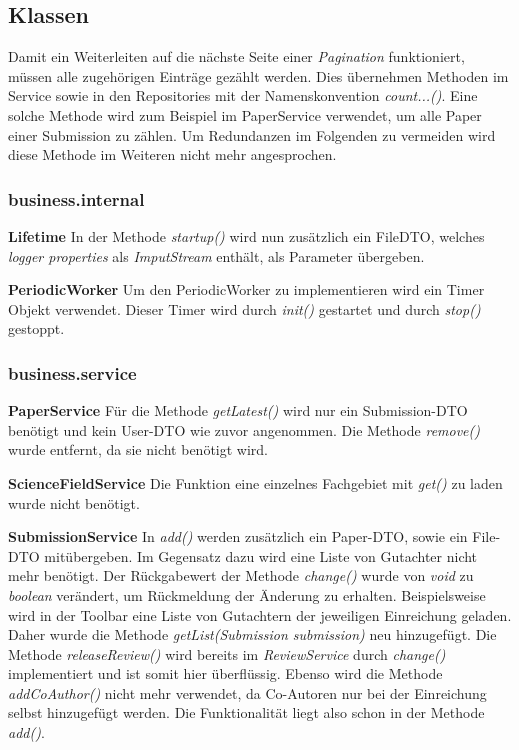 
\subsection{Klassen}

Damit ein Weiterleiten auf die nächste Seite einer \emph{Pagination} funktioniert, müssen alle zugehörigen Einträge gezählt werden. Dies übernehmen Methoden im Service sowie in den Repositories mit der Namenskonvention \emph{count...()}. Eine solche Methode wird zum Beispiel im PaperService verwendet, um alle Paper einer Submission zu zählen. Um Redundanzen im Folgenden zu vermeiden wird diese Methode im Weiteren nicht mehr angesprochen.


\subsubsection{business.internal}

\textbf{Lifetime} In der Methode \emph{startup()} wird nun zusätzlich ein FileDTO, welches \emph{logger properties} als \emph{ImputStream} enthält, als Parameter übergeben.

\textbf{PeriodicWorker} Um den PeriodicWorker zu implementieren wird ein Timer Objekt verwendet. Dieser Timer wird durch \emph{init()} gestartet und durch \emph{stop()} gestoppt.

\subsubsection{business.service}

\textbf{PaperService} Für die Methode \emph{getLatest()} wird nur ein Submission-DTO benötigt und kein User-DTO wie zuvor angenommen. \newline
Die Methode \emph{remove()} wurde entfernt, da sie nicht benötigt wird.

\textbf{ScienceFieldService} Die Funktion eine einzelnes Fachgebiet mit \emph{get()} zu laden wurde nicht benötigt.

\textbf{SubmissionService} In \emph{add()} werden zusätzlich ein Paper-DTO, sowie ein File-DTO mitübergeben. Im Gegensatz dazu wird eine Liste von Gutachter nicht mehr benötigt. \newline
Der Rückgabewert der Methode \emph{change()} wurde von \emph{void} zu \emph{boolean} verändert, um Rückmeldung der Änderung zu erhalten. \newline
Beispielsweise wird in der Toolbar eine Liste von Gutachtern der jeweiligen Einreichung geladen. Daher wurde die Methode \emph{getList(Submission submission)} neu hinzugefügt. \newline
Die Methode \emph{releaseReview()} wird bereits im \emph{ReviewService} durch \emph{change()} implementiert und ist somit hier überflüssig. \newline
Ebenso wird die Methode \emph{addCoAuthor()} nicht mehr verwendet, da Co-Autoren nur bei der Einreichung selbst hinzugefügt werden. Die Funktionalität liegt also schon in der Methode \emph{add()}.

